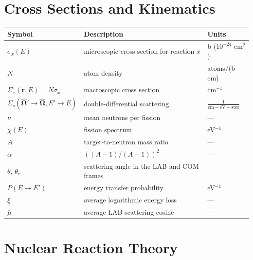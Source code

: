 \section*{Cross Sections and Kinematics}

\begin{center}
 {\small
 \begin{tabular}{lll}
  \toprule
   Symbol                                        & Description                   & Units  \\
  \midrule
   $\sigma_x(E)$                                 & microscopic cross section for reaction $x$ & b ($10^{-24}$ cm$^2$) \\
   $N$                                           & atom density                  & atoms/(b-cm) \\
   $\Sigma_x(\mathbf{r},E) = N\sigma_x$          & macroscopic cross section     & cm$^{-1}$ \\
   $\Sigma_s(\hat{\bm{\Omega}}'\to\hat{\bm{\Omega}},E'\to E)$ & double-differential scattering &  $\frac{1}{\mathrm{cm-eV-ster}}$ \\
   $\nu$                                         & mean neutrons per fission     & --- \\
   $\chi(E)$                                     & fission spectrum              & eV$^{-1}$ \\
   $A$                                           & target-to-neutron mass ratio  & --- \\
   $\alpha$                                      & $\left((A-1)/(A+1)\right)^2$  & --- \\
   $\theta$, $\theta_c$                          & scattering angle in the LAB and COM frames & --- \\
   $P(E\to E')$                                  & energy transfer probability   & eV$^{-1}$ \\
   $\xi$                                         & average logarithmic energy loss & --- \\
   $\bar{\mu}$                                   & average LAB scattering cosine & --- \\
  \bottomrule
 \end{tabular}
 }
\end{center}

\section*{Nuclear Reaction Theory}

